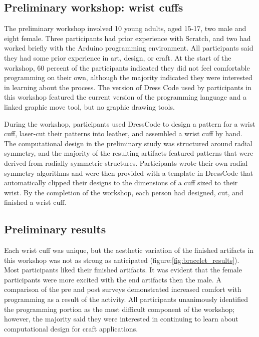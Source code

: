\documentclass{sigchi}
\begin{document}
\subsection{Preliminary workshop: wrist cuffs}
The preliminary workshop involved 10 young adults, aged 15-17, two male and eight female. Three participants had prior experience with Scratch, and two had worked briefly with the Arduino programming environment. All participants said they had some prior experience in art, design, or craft. At the start of the workshop, 60 percent of the participants indicated they did not feel comfortable programming on their own, although the majority indicated they were interested in learning about the process. The version of Dress Code used by participants in this workshop featured the current version of the programming language and a linked graphic move tool, but no graphic drawing tools.

During the workshop, participants used DressCode to design a pattern for a wrist cuff, laser-cut their patterns into leather, and assembled a wrist cuff by hand. The computational design in the preliminary study was structured around radial symmetry, and the majority of the resulting artifacts featured patterns that were derived from radially symmetric structures. Participants wrote their own radial symmetry algorithms and were then provided with a template in DressCode that automatically clipped their designs to the dimensions of a cuff sized to their wrist. By the completion of the workshop, each person had designed, cut, and finished a wrist cuff.
\vspace{20pt}
\subsection{Preliminary results}
Each wrist cuff was unique, but the aesthetic variation of the finished artifacts in this workshop was not as strong as anticipated (figure:\ref{fig:bracelet_results}). Most participants liked their finished artifacts. It was evident that the female participants were more excited with the end artifacts then the male. A comparison of the pre and post surveys demonstrated increased comfort with programming as a result of the activity. All participants unanimously identified the programming portion as the most difficult component of the workshop; however, the majority said they were interested in continuing to learn about computational design for craft applications.
\end{document}
